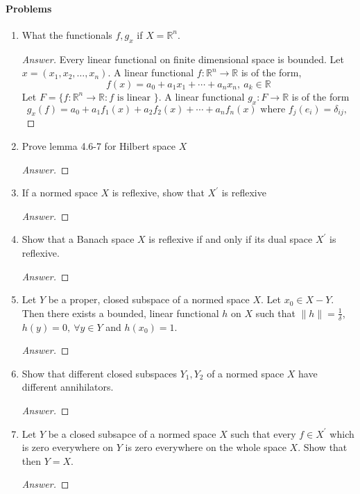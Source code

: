 \paragraph{Problems}
\begin{enumerate}
	\item What the functionals $f,g_x$ if $X = \mathbb{R}^n$.
		\begin{proof}[Answer]
			Every linear functional on finite dimensional space is bounded.
			Let $x = (x_1,x_2,\dots,x_n)$.
			A linear functional $f : \mathbb{R}^n \to \mathbb{R}$ is of the form,
			\[ f(x) = a_0+a_1x_1+\dotsb+a_nx_n,\ a_k \in \mathbb{R} \]
			Let $F = \{ f : \mathbb{R}^n \to \mathbb{R} : f \text{ is linear } \}$.
			A linear functional $g_x : F \to \mathbb{R}$ is of the form
			\[ g_x(f) = a_0 + a_1f_1(x)+a_2f_2(x)+\dotsb+a_nf_n(x) \text{ where } f_j(e_i) = \delta_{ij},\  \]
		\end{proof}
	\item Prove lemma 4.6-7 for Hilbert space $X$
		\begin{proof}[Answer]
		\end{proof}
	\item If a normed space $X$ is reflexive, show that $X^\prime$ is reflexive
		\begin{proof}[Answer]
		\end{proof}
	\item Show that a Banach space $X$ is reflexive if and only if its dual space $X^\prime$ is reflexive.
		\begin{proof}[Answer]
		\end{proof}
	\item Let $Y$ be a proper, closed subspace of a normed space $X$.
		Let $x_0 \in X-Y$.
		Then there exists a bounded, linear functional $h$ on $X$ such that $\|h\| = \frac{1}{\delta}$, $h(y) = 0,\ \forall y \in Y$ and $h(x_0) = 1$.
		\begin{proof}[Answer]
		\end{proof}
	\item Show that different closed subspaces $Y_1,Y_2$ of a normed space $X$ have different annihilators.
		\begin{proof}[Answer]
		\end{proof}
	\item Let $Y$ be a closed subsapce of a normed space $X$ such that every $f \in X^\prime$ which is zero everywhere on $Y$ is zero everywhere on the whole space $X$.
		Show that then $Y = X$.
		\begin{proof}[Answer]
		\end{proof}

\end{enumerate}
